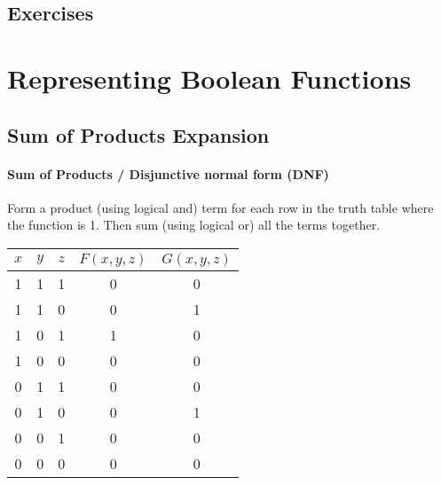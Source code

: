 \documentclass[12pt letter]{report}
\begin{document}
\section{Exercises}

\chapter{Representing Boolean Functions}

\section{Sum of Products Expansion}




\subsubsection{Sum of Products / Disjunctive normal form (DNF)}

Form a product (using logical and) term for each row in the truth table where the function is 1. Then sum (using logical or) all the terms together.

\begin{table}[h!]
	\begin{center}
		\begin{tabular}{|c c c|c|c|}
			\hline
			$x$ & $y$ & $z$ & $F \left( x, y, z \right) $ & $G \left( x,y,z \right) $ \\ [0.5ex]
			\hline
			\hline
			1   & 1   & 1   & 0                           & 0                         \\
			1   & 1   & 0   & 0                           & 1                         \\
			1   & 0   & 1   & 1                           & 0                         \\
			1   & 0   & 0   & 0                           & 0                         \\
			0   & 1   & 1   & 0                           & 0                         \\
			0   & 1   & 0   & 0                           & 1                         \\
			0   & 0   & 1   & 0                           & 0                         \\
			0   & 0   & 0   & 0                           & 0                         \\
			\hline
		\end{tabular}
	\end{center}
\end{table}
\end{document}
